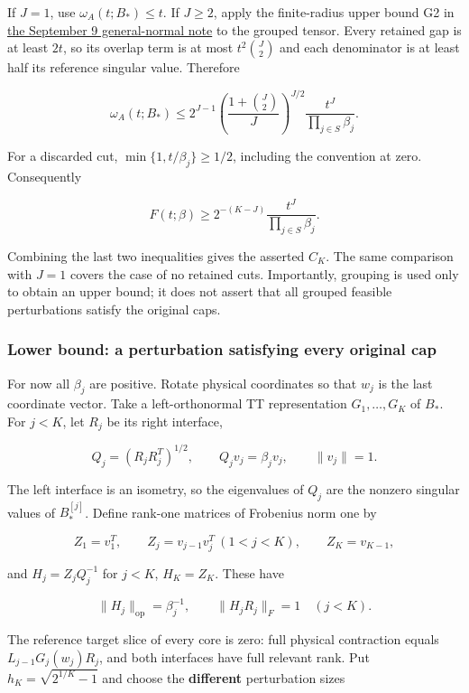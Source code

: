 \documentclass[
  11pt,
]{article}
\begin{document}
If \(J=1\), use \(\omega_A(t;B_*)\le t\). If \(J\ge2\), apply the
finite-radius upper bound G2 in
\href{../../theory/general_normal_modulus.md}{the September 9
general-normal note} to the grouped tensor. Every retained gap is at
least \(2t\), so its overlap term is at most \(t^2\binom J2\) and each
denominator is at least half its reference singular value. Therefore

\[\omega_A(t;B_*)\le
2^{J-1}\left(\frac{1+\binom J2}{J}\right)^{J/2}
\frac{t^J}{\prod_{j\in S}\beta_j}.\]

For a discarded cut, \(\min\{1,t/\beta_j\}\ge1/2\), including the
convention at zero. Consequently

\[F(t;\beta)\ge 2^{-(K-J)}\frac{t^J}{\prod_{j\in S}\beta_j}.\]

Combining the last two inequalities gives the asserted \(C_K\). The same
comparison with \(J=1\) covers the case of no retained cuts.
Importantly, grouping is used only to obtain an upper bound; it does not
assert that all grouped feasible perturbations satisfy the original
caps.

\subsubsection{Lower bound: a perturbation satisfying every original
cap}\label{lower-bound-a-perturbation-satisfying-every-original-cap}

For now all \(\beta_j\) are positive. Rotate physical coordinates so
that \(w_j\) is the last coordinate vector. Take a left-orthonormal TT
representation \(G_1,\ldots,G_K\) of \(B_*\). For \(j<K\), let \(R_j\)
be its right interface,

\[Q_j=(R_jR_j^T)^{1/2},\qquad Q_jv_j=\beta_jv_j,\qquad\|v_j\|=1.\]

The left interface is an isometry, so the eigenvalues of \(Q_j\) are the
nonzero singular values of \(B_*^{[j]}\). Define rank-one matrices of
Frobenius norm one by

\[Z_1=v_1^T,\qquad Z_j=v_{j-1}v_j^T\ (1<j<K),\qquad Z_K=v_{K-1},\]

and \(H_j=Z_jQ_j^{-1}\) for \(j<K\), \(H_K=Z_K\). These have

\[\|H_j\|_{\mathrm{op}}=\beta_j^{-1},\qquad
\|H_jR_j\|_F=1\quad(j<K).\]

The reference target slice of every core is zero: full physical
contraction equals \(L_{j-1}G_j(w_j)R_j\), and both interfaces have full
relevant rank. Put \(h_K=\sqrt{2^{1/K}-1}\) and choose the
\textbf{different} perturbation sizes
\end{document}
